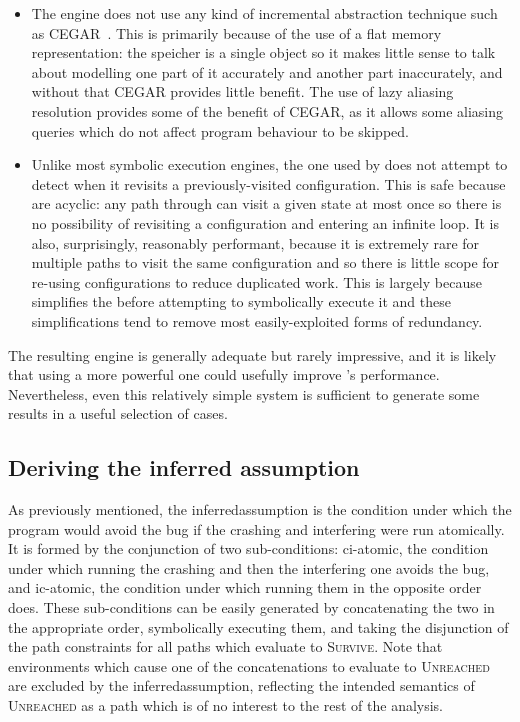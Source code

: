 \begin{itemize}
\item The engine does not use any kind of incremental abstraction
  technique such as CEGAR~\cite{Clarke2003}.  This is primarily
  because of the use of a flat memory representation: the speicher is
  a single object so it makes little sense to talk about modelling one
  part of it accurately and another part inaccurately, and without
  that CEGAR provides little benefit.  The use of lazy aliasing
  resolution provides some of the benefit of CEGAR, as it allows some
  aliasing queries which do not affect program behaviour to be
  skipped.

\item Unlike most symbolic execution engines, the one used by
  {\implementation} does not attempt to detect when it revisits a
  previously-visited configuration.  This is safe because
  {\StateMachines} are acyclic: any path through {\AStateMachine} can
  visit a given state at most once so there is no possibility of
  revisiting a configuration and entering an infinite loop.  It is
  also, surprisingly, reasonably performant, because it is extremely
  rare for multiple paths to visit the same configuration and so there
  is little scope for re-using configurations to reduce duplicated
  work.  This is largely because {\technique} simplifies the
  {\StateMachine} before attempting to symbolically execute it and
  these simplifications tend to remove most easily-exploited forms of
  redundancy.
\end{itemize}
The resulting engine is generally adequate but rarely impressive, and
it is likely that using a more powerful one could usefully improve
{\implementation}'s performance.  Nevertheless, even this relatively
simple system is sufficient to generate some results in a useful
selection of cases.

\subsection{Deriving the inferred assumption}
\label{sect:derive:inferred_assumption}

As previously mentioned, the \gls{inferredassumption} is the condition
under which the program would avoid the bug if the crashing and
interfering {\StateMachines} were run atomically.  It is formed by the
conjunction of two sub-conditions: \gls{ci-atomic}, the condition
under which running the crashing {\StateMachine} and then the
interfering one avoids the bug, and \gls{ic-atomic}, the condition
under which running them in the opposite order does.  These
sub-conditions can be easily generated by concatenating the two
{\StateMachines} in the appropriate order, symbolically executing
them, and taking the disjunction of the path constraints for all paths
which evaluate to \textsc{Survive}.  Note that {\StateMachine}
environments which cause one of the concatenations to evaluate to
\textsc{Unreached} are excluded by the \gls{inferredassumption},
reflecting the intended semantics of \textsc{Unreached} as a path
which is of no interest to the rest of the analysis.

